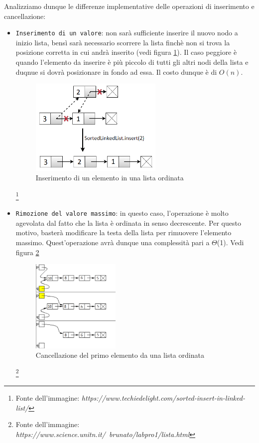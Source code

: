 \documentclass{article}
\begin{document}
Analizziamo dunque le differenze implementative delle operazioni di inserimento e cancellazione:

\begin{itemize}
    \item \verb|Inserimento di un valore|: non sarà sufficiente inserire il nuovo nodo a inizio lista, bensì sarà necessario scorrere la lista finchè non si trova la posizione corretta in cui andrà inserito (vedi figura \ref{fig: Linked4}). Il caso peggiore è quando l'elemento da inserire è più piccolo di tutti gli altri nodi della lista e duqnue si dovrà posizionare in fondo ad essa. Il costo dunque è di $O(n)$.

    \begin{figure}[H]
    \includegraphics[width=0.6\textwidth]{Images/Linked4.png}
    \centering
    \caption{Inserimento di un elemento in una lista ordinata}
    \label{fig: Linked4}
    \end{figure}
    
    \footnote{Fonte dell'immagine: \textit{https://www.techiedelight.com/sorted-insert-in-linked-list/}}


    \item \verb|Rimozione del valore massimo|: in questo caso, l'operazione è molto agevolata dal fatto che la lista è ordinata in senso decrescente. Per questo motivo, basterà modificare la testa della lista per rimuovere l'elemento massimo. Quest'operazione avrà dunque una complessità pari a $\Theta$(1). Vedi figura \ref{fig: Linked5}

    \begin{figure}[H]
    \includegraphics[width=0.4\textwidth]{Images/Linked5.png}
    \centering
    \caption{Cancellazione del primo elemento da una lista ordinata}
    \label{fig: Linked5}
    \end{figure}
    
    \footnote{Fonte dell'immagine: \textit{https://www.science.unitn.it/~brunato/labpro1/lista.html}}

\end{itemize}
\end{document}
